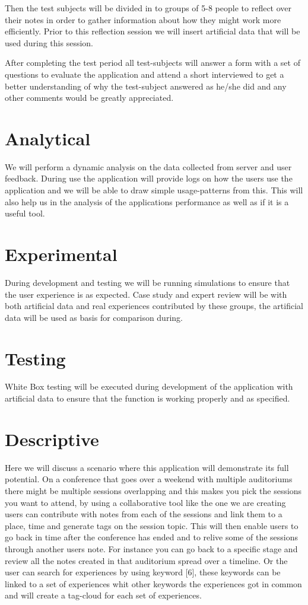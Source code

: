 Then the test subjects will be divided in to groups of 5-8 people to reflect over their notes in order to gather information about how they might work more efficiently. Prior to this reflection session we will insert artificial data that will be used during this session.

After completing the test period all test-subjects will answer a form with a set of questions to evaluate the application and attend a short interviewed to get a better understanding of why the test-subject answered as he/she did and any other comments would be greatly appreciated.
\section{Analytical}
We will perform a dynamic analysis on the data collected from server and user feedback. During use the application will provide logs on how the users use the application and we will be able to draw simple usage-patterns from this. This will also help us in the analysis of the applications performance as well as if it is a useful tool.
\section{Experimental}
During development and testing we will be running simulations to ensure that the user experience is as expected. Case study and expert review will be with both artificial data and real experiences contributed by these groups, the artificial data will be used as basis for comparison during.
\section{Testing}
White Box testing will be executed during development of the application with artificial data to ensure that the function is working properly and as specified.
\section{Descriptive}
Here we will discuss a scenario where this application will demonstrate its full potential.
On a conference that goes over a weekend with multiple auditoriums there might be multiple sessions overlapping and this makes you pick the sessions you want to attend, by using a collaborative tool like the one we are creating users can contribute with notes from each of the sessions and link them to a place, time and generate tags on the session topic. 
This will then enable users to go back in time after the conference has ended and to relive some of the sessions through another users note. For instance you can go back to a specific stage and review all the notes created in that auditorium spread over a timeline. Or the user can search for experiences by using keyword [6], these keywords can be linked to a set of experiences whit other keywords the experiences got in common and will create a tag-cloud for each set of experiences.
